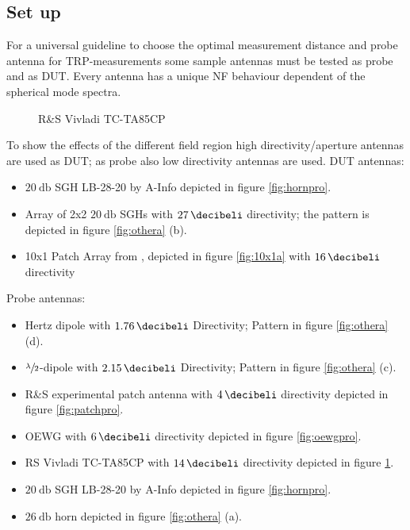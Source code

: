 \subsection{Set up}

For a universal guideline to choose the optimal measurement distance and probe antenna for \ac{TRP}-measurements some sample antennas must be tested as probe and as \ac{DUT}. Every antenna has a unique \ac{NF} behaviour dependent of the spherical mode spectra.

\begin{figure}
  \centering
  \centering
\caption{R\&{}S Vivladi TC-TA85CP}
\label{fig:vivpro}
\end{figure}

To show the effects of the different field region high directivity/aperture antennas are used as \ac{DUT}; as probe also low directivity antennas are used. \ac{DUT} antennas:

\begin{itemize}
\item $\SI{20}{\decibel}$ \ac{SGH} LB-28-20 by A-Info depicted in figure \ref{fig:hornpro}.
\item Array of 2x2 $\SI{20}{\decibel}$ \acp{SGH} with $\SI{27}{\decibeli}$ directivity; the pattern is depicted in figure \ref{fig:othera} (b).
\item 10x1 Patch Array from \cite{7481205}, depicted in figure \ref{fig:10x1a} with $\SI{16}{\decibeli}$ directivity
\end{itemize}

Probe antennas:

\begin{itemize}
\item Hertz dipole with $\SI{1.76}{\decibeli}$ Directivity; Pattern in figure \ref{fig:othera} (d).
\item $\sfrac{\lambda}{2}$-dipole with $\SI{2.15}{\decibeli}$ Directivity; Pattern in figure \ref{fig:othera} (c).
\item R\&{}S experimental patch antenna with $\SI{4}{\decibeli}$ directivity depicted in figure \ref{fig:patchpro}.
\item \ac{OEWG} with $\SI{6}{\decibeli}$ directivity depicted in figure \ref{fig:oewgpro}.
\item \ac{RS} Vivladi TC-TA85CP with $\SI{14}{\decibeli}$ directivity depicted in figure \ref{fig:vivpro}.
\item $\SI{20}{\decibel}$ \ac{SGH} LB-28-20 by A-Info depicted in figure \ref{fig:hornpro}.
\item $\SI{26}{\decibel}$ horn depicted in figure \ref{fig:othera} (a).
\end{itemize}

